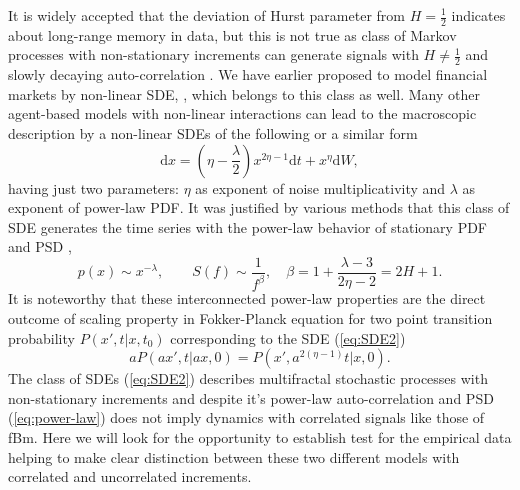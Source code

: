 \documentclass{article}
\newcommand{\rmd}{\mathrm{d}}
\begin{document}
It is widely accepted that the deviation of Hurst parameter from $H=\frac{1}{2}$ indicates about long-range memory in data, but this is not true as class of Markov processes with non-stationary increments can generate signals with $H\neq\frac{1}{2}$ and slowly decaying auto-correlation \cite{McCauley2006PhysA}.  We have earlier proposed to model financial markets by non-linear SDE, \cite{Gontis2004PhysA,Gontis2006JStatMech,Gontis2008PhysA,Gontis2014PlosOne,Gontis2016PhysA}, which belongs to this class as well. Many other agent-based models with non-linear interactions can lead to the macroscopic description by a non-linear SDEs of the following or a similar form\cite{Kaulakys2005PhysRevE,Ruseckas2014JStatMech} 
\begin{equation}
\rmd x=\left( \eta-\frac{\lambda}{2} \right) x^{2\eta-1} \rmd t +x^{\eta} \rmd W, \label{eq:SDE2}
\end{equation} 
having just two parameters:  $\eta$ as exponent of noise multiplicativity and $\lambda$ as exponent of power-law PDF. It was justified by various methods that this class of SDE generates the time series with the power-law behavior of stationary PDF and PSD \cite{Ruseckas2014JStatMech},
\begin{equation}
p(x)\sim x^{-\lambda},\qquad S(f)\sim \frac{1}{f^\beta},\quad \beta=1+\frac{\lambda-3}{2\eta-2}=2H+1.
\label{eq:power-law}
\end{equation}
It is noteworthy that these interconnected power-law properties are the direct outcome of scaling property in Fokker-Planck equation for two point transition probability $P(x\prime,t \vert x,t_0)$ corresponding to the SDE (\ref{eq:SDE2}) \cite{Ruseckas2014JStatMech}
\begin{equation}
aP(ax\prime,t \vert ax,0)=P(x\prime,a^{2(\eta-1)}t \vert x,0).
\label{eq:scaling}
\end{equation}
The class of SDEs (\ref{eq:SDE2}) describes multifractal stochastic processes with non-stationary increments \cite{McCauley2006PhysA,McCauley2007PhysA} and despite it's power-law auto-correlation and PSD (\ref{eq:power-law}) does not imply dynamics with correlated signals like those of fBm. Here we will look for the opportunity to establish test for the empirical data helping to make clear distinction between these two different models with correlated and  uncorrelated increments. 
\end{document}

